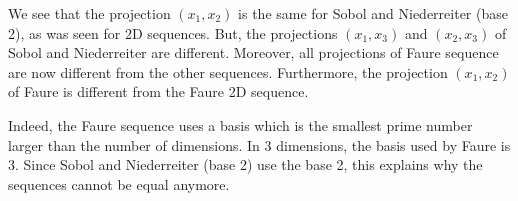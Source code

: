 We see that the projection $(x_1,x_2)$ is the same for 
Sobol and Niederreiter (base 2), as was seen for 2D sequences. 
But, the projections $(x_1,x_3)$ and $(x_2,x_3)$ of Sobol and Niederreiter 
are different. 
Moreover, all projections of Faure sequence are now different from the 
other sequences. 
Furthermore, the projection $(x_1,x_2)$ of Faure is different from the 
Faure 2D sequence.

Indeed, the Faure sequence uses a basis which is the smallest prime number 
larger than the number of dimensions. 
In 3 dimensions, the basis used by Faure is 3. 
Since Sobol and Niederreiter (base 2) use the base 2, this explains 
why the sequences cannot be equal anymore.
